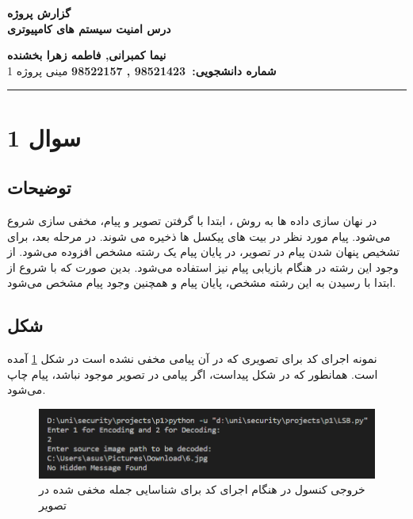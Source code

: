 
\def \Subject {گزارش پروژه}
\def \Course {درس امنیت سیستم های کامپیوتری}
\def \Author {نیما کمبرانی, فاطمه زهرا بخشنده}
\def \Report {مینی پروژه 1}
\def \StudentNumber {98521423 , 98522157}

\begin{center}
\vspace{.4cm}
{\bf {\huge \Subject}}\\
{\bf \Large \Course}
\vspace{.2cm}
\end{center}
{\bf \Author }  \\
{\bf شماره دانشجویی:\ \StudentNumber}
\hspace{\fill} 
{\Large \Report} \\
\hrule
\vspace{0.8cm}

\clearpage

\par

\section{سوال 1}
\subsection{توضیحات}
در نهان سازی داده ها به روش 
، ابتدا با گرفتن تصویر و پیام، مخفی سازی شروع می‌شود. پیام مورد نظر در بیت های  
پیکسل ها ذخیره می شوند. 
در مرحله بعد، برای تشخیص پنهان شدن پیام در تصویر، در پایان پیام یک رشته مشخص افزوده می‌شود. از وجود این رشته در هنگام بازیابی پیام نیز استفاده می‌شود. بدین صورت که با شروع از ابتدا با رسیدن به این رشته مشخص، پایان پیام و همچنین وجود پیام مشخص می‌شود.




\subsection{شکل}
\par

نمونه اجرای کد برای تصویری که در آن پیامی مخفی نشده است در شکل
 \ref{fig:LSBDecode2}
آمده است. همانطور که در شکل پیداست، اگر پیامی در تصویر موجود نباشد، پیام 
چاپ می‌شود.

\begin{figure}[h!]
    \centering
    \includegraphics[width=0.5\linewidth]{images/LSB_Decode2.png}
    \caption{خروجی کنسول در هنگام اجرای کد برای شناسایی جمله مخفی شده در تصویر}
    \label{fig:LSBDecode2}
\end{figure}

